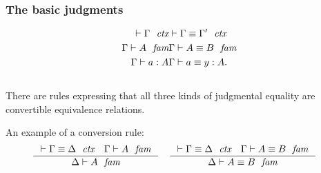 \documentclass{beamer}
\begin{document}
\begin{frame}
\frametitle{\bf The basic judgments}
\begin{align*}
\jalign\jctx{\Gamma} 
& \jalign\jctxeq{\Gamma}{\Gamma'}
  \\
\jalign\jfam{\Gamma}{A} 
& \jalign\jfameq{\Gamma}{A}{B}
  \\
\jalign\jterm{\Gamma}{A}{a} 
& \jalign\jtermeq{\Gamma}{A}{a}{y}.
\end{align*}
\\[\baselineskip]
There are rules expressing that all three kinds of judgmental equality are
convertible equivalence relations.

\pause
An example of a conversion rule:
\begin{align*}
& \inference
  { \jctxeq{\Gamma}{\Delta}
    \jfam{\Gamma}{A}
    }
  { \jfam{\Delta}{A}
    }
& & \inference
    { \jctxeq{\Gamma}{\Delta}
      \jfameq{\Gamma}{A}{B}
      }
    { \jfameq{\Delta}{A}{B}
      }
\end{align*}
\end{frame}
\end{document}
